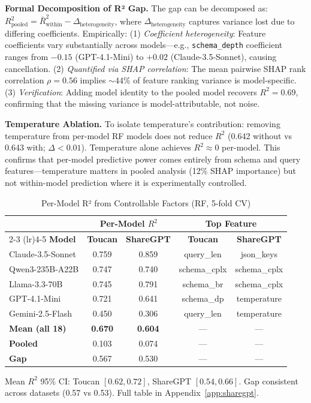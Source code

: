 \documentclass[sigconf,anonymous,review]{acmart}
\begin{document}
\textbf{Formal Decomposition of R² Gap.} The gap can be decomposed as: $R^2_{\text{pooled}} = \bar{R}^2_{\text{within}} - \Delta_{\text{heterogeneity}}$, where $\Delta_{\text{heterogeneity}}$ captures variance lost due to differing coefficients. Empirically: (1) \textit{Coefficient heterogeneity}: Feature coefficients vary substantially across models---e.g., \texttt{schema\_depth} coefficient ranges from $-0.15$ (GPT-4.1-Mini) to $+0.02$ (Claude-3.5-Sonnet), causing cancellation. (2) \textit{Quantified via SHAP correlation}: The mean pairwise SHAP rank correlation $\rho = 0.56$ implies $\sim44\%$ of feature ranking variance is model-specific. (3) \textit{Verification}: Adding model identity to the pooled model recovers $R^2 = 0.69$, confirming that the missing variance is model-attributable, not noise.

\textbf{Temperature Ablation.} To isolate temperature's contribution: removing temperature from per-model RF models does not reduce $R^2$ (0.642 without vs 0.643 with; $\Delta < 0.01$). Temperature alone achieves $R^2 \approx 0$ per-model. This confirms that per-model predictive power comes entirely from schema and query features---temperature matters in pooled analysis (12\% SHAP importance) but not within-model prediction where it is experimentally controlled.

\begin{table}[t]
\centering
\caption{Per-Model R² from Controllable Factors (RF, 5-fold CV)}
\label{tab:permodel_r2}
\small
\begin{tabular}{@{}lcccc@{}}
\toprule
& \multicolumn{2}{c}{\textbf{Per-Model $R^2$}} & \multicolumn{2}{c}{\textbf{Top Feature}} \\
\cmidrule(lr){2-3} \cmidrule(lr){4-5}
\textbf{Model} & \textbf{Toucan} & \textbf{ShareGPT} & \textbf{Toucan} & \textbf{ShareGPT} \\
\midrule
Claude-3.5-Sonnet & 0.759 & 0.859 & query\_len & json\_keys \\
Qwen3-235B-A22B & 0.747 & 0.740 & schema\_cplx & schema\_cplx \\
Llama-3.3-70B & 0.745 & 0.791 & schema\_br & schema\_cplx \\
GPT-4.1-Mini & 0.721 & 0.641 & schema\_dp & temperature \\
Gemini-2.5-Flash & 0.450 & 0.306 & query\_len & temperature \\
\midrule
\textbf{Mean (all 18)} & \textbf{0.670} & \textbf{0.604} & --- & --- \\
\textbf{Pooled} & 0.103 & 0.074 & --- & --- \\
\textbf{Gap} & 0.567 & 0.530 & --- & --- \\
\bottomrule
\end{tabular}
\vspace{0.3em}

\raggedright\footnotesize Mean $R^2$ 95\% CI: Toucan $[0.62, 0.72]$, ShareGPT $[0.54, 0.66]$. Gap consistent across datasets (0.57 vs 0.53). Full table in Appendix~\ref{app:sharegpt}.
\end{table}
\end{document}
